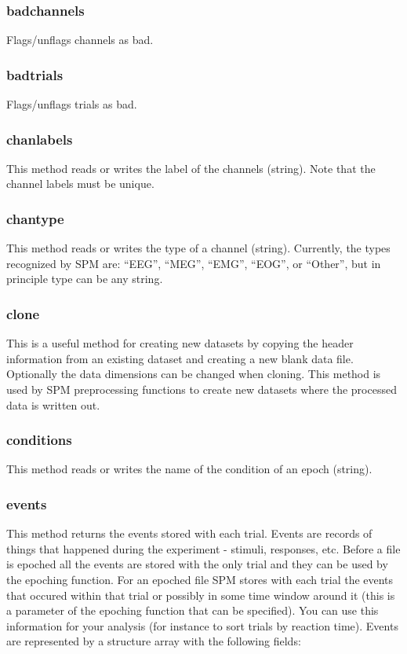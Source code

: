 \subsubsection{badchannels}
Flags/unflags channels as bad. 

\subsubsection{badtrials}
Flags/unflags trials as bad. 

\subsubsection{chanlabels}
This method reads or writes the label of the channels (string).  Note that the channel labels must be unique.

\subsubsection{chantype}
This method reads or writes the type of a channel (string). Currently, the types recognized by SPM are: ``EEG'', ``MEG'', ``EMG'', ``EOG'', or ``Other'', but in principle type can be any string.

\subsubsection{clone}
This is a useful method for creating new datasets by copying the header information from an existing dataset and creating a new blank data file. Optionally the data dimensions can be changed when cloning. This method is used by SPM preprocessing functions to create new datasets where the processed data is written out.

\subsubsection{conditions}
This method  reads or writes the name of the condition of an epoch (string).

\subsubsection{events}
This method returns the events stored with each trial. Events are records of things that happened during the experiment - stimuli, responses, etc. Before a file is epoched all the events are stored with the only trial and they can be used by the epoching function. For an epoched file SPM stores with each trial the events that occured within that trial or possibly in some time window around it (this is a parameter of the epoching function that can be specified). You can use this information for your analysis (for instance to sort trials by reaction time). Events are represented by a structure array with the following fields:

